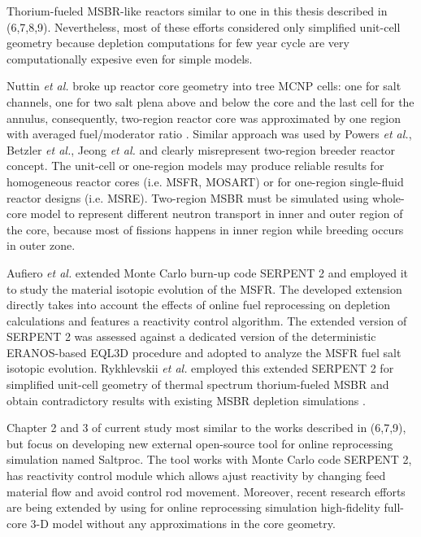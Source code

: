 Thorium-fueled \gls{MSBR}-like reactors similar to one in this thesis described in (6,7,8,9). Nevertheless, most of these efforts considered only simplified unit-cell geometry because depletion computations for few year cycle are very computationally expesive even for simple models. 

Nuttin \emph{et al.} broke up reactor core geometry into tree \gls{MCNP} cells: one for salt channels, one for two salt plena above and below the core and the last cell for the annulus, consequently, two-region reactor core was approximated by one region with averaged fuel/moderator ratio \cite{nuttin_potential_2005}.  Similar approach was used by Powers \emph{et al.}, Betzler \emph{et al.}, Jeong \emph{et al.} \cite{powers_new_2013,powers_inventory_2014,betzler_modeling_2016, betzler_molten_2017, jeong_development_2014, jeong_equilibrium_2016} and clearly misrepresent two-region breeder reactor concept. The unit-cell or one-region models may produce reliable results for homogeneous reactor cores (i.e. \gls{MSFR}, \gls{MOSART}) or for one-region single-fluid reactor designs (i.e. \gls{MSRE}). Two-region \gls{MSBR} must be simulated using whole-core model to represent different neutron transport in inner and outer region of the core, because most of fissions happens in inner region while breeding occurs in outer zone.  

Aufiero \emph{et al.} extended Monte Carlo burn-up code SERPENT 2 and employed it to study the material isotopic evolution of the \gls{MSFR}. The developed extension directly takes into account the effects of online fuel reprocessing on depletion calculations and features a reactivity control algorithm. The extended version of SERPENT 2 was assessed against a dedicated version of the deterministic ERANOS-based EQL3D procedure \cite{ruggieri_eranos_2006} and adopted to analyze the \gls{MSFR} fuel salt isotopic evolution. Rykhlevskii \emph{et al.} employed this extended SERPENT 2 for simplified unit-cell geometry of thermal spectrum thorium-fueled \gls{MSBR} and obtain contradictory results with existing \gls{MSBR} depletion simulations \cite{jeong_equilibrium_2016}.

Chapter 2 and 3 of current study most similar to the works described in (6,7,9), but focus on developing new external open-source tool for online reprocessing simulation named Saltproc. The tool works with Monte Carlo code SERPENT 2, has reactivity control module which allows ajust reactivity by changing feed material flow and avoid control rod movement. Moreover, recent research efforts are being extended by using for online reprocessing simulation high-fidelity full-core 3-D model without any approximations in the core geometry.

